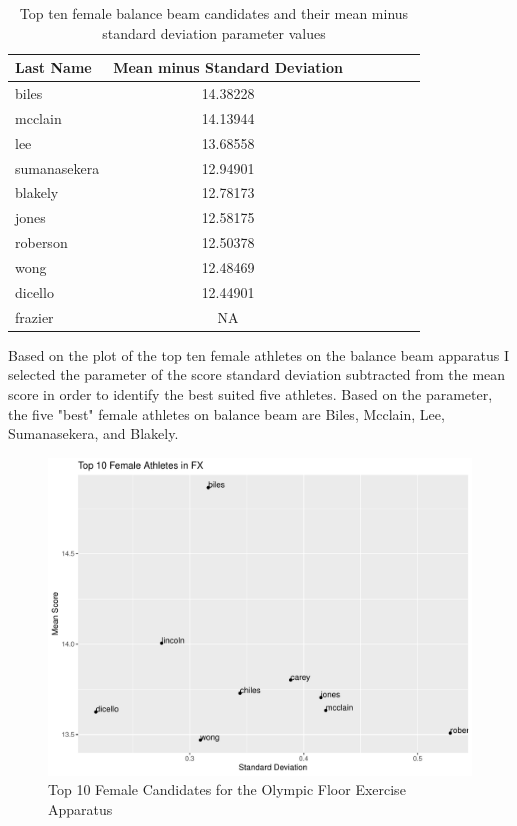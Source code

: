\documentclass[12pt]{article}
\begin{document}
\begin{table}
  \caption{Top ten female balance beam candidates and their mean minus standard deviation parameter values}
  \label{tab:tableBBP}
\centering
\begin{tabular}[t]{lccllll}
 \toprule
Last Name & Mean minus Standard Deviation\\
\midrule
biles & 14.38228\\
\midrule
mcclain & 14.13944\\
\midrule
lee & 13.68558\\
\midrule
sumanasekera & 12.94901\\
\midrule
blakely & 12.78173\\
\midrule
jones & 12.58175\\
\midrule
roberson & 12.50378\\
\midrule
wong & 12.48469\\
\midrule
dicello & 12.44901\\
\midrule
frazier & NA\\
\bottomrule
\end{tabular}
\end{table}

Based on the plot of the top ten female athletes on the balance beam apparatus I selected the parameter of 
the score standard deviation subtracted from the mean score in order to identify the best suited five 
athletes. Based on the parameter, the five "best" female athletes on balance beam are Biles, Mcclain, 
Lee, Sumanasekera, and Blakely.


\begin{figure}
  \centering
  \includegraphics[scale=0.6]{FemaleAthletesFX.pdf}
  \caption{Top 10 Female Candidates for the Olympic Floor Exercise Apparatus}
  \label{fig:FX}
\end{figure}
\end{document}
